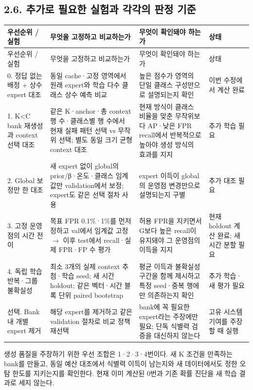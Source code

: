\subsection*{2.6. 추가로 필요한 실험과 각각의 판정 기준}
\begingroup
\footnotesize
\begin{longtable}{>{\raggedright\arraybackslash}p{}>{\raggedright\arraybackslash}p{}>{\raggedright\arraybackslash}p{}>{\raggedright\arraybackslash}p{}}
\toprule
우선순위 /\allowbreak{} 실험 & 무엇을 고정하고 비교하는가 & 무엇이 확인돼야 하는가 & 상태 \\ \midrule
\endfirsthead
우선순위 /\allowbreak{} 실험 & 무엇을 고정하고 비교하는가 & 무엇이 확인돼야 하는가 & 상태 \\ \midrule
\endhead
{}0. 정답 없는 배정 +\allowbreak{} 상수 expert 대조 & 동일 cache·고정 영역에서 원래 expert와 학습 다수 클래스 상수 예측 비교 & 높은 점수가 영역의 단일 클래스 구성만으로 설명되는지 확인 & 이번 수정에서 계산 완료 \\
{}1. K<C bank 재생성과 context 선택 대조 & 같은 K·anchor·총 context 행 수·클래스별 행 수에서 현재 실패 패턴 선택 vs 무작위 선택; 별도 동일 크기 균형 context 대조 & 현재 방식이 클래스 비율을 맞춘 무작위보다 AP·낮은 FPR recall에서 반복적으로 높아야 생성 방식의 효과를 지지 & 추가 학습 필요 \\
{}2. Global 보정만 한 대조 & 새 expert 없이 global의 prior/\allowbreak{}β·온도·클래스 임계값만 validation에서 보정; expert도 같은 선택 절차 사용 & expert 이득이 global의 운영점 변경만으로 설명되는지 구별 & 추가 대조 필요 \\
{}3. 고정 운영점의 시간 전이 & 목표 FPR 0.1\%·1\%를 먼저 정하고 val에서 임계값 고정  \ensuremath{\rightarrow}  이후 test에서 recall·실제 FPR·FP 수 평가 & 허용 FPR을 지키면서 G보다 높은 recall이 유지돼야 그 운영점의 이득을 지지 & 현재 holdout 계산 완료; 새 시간 분할 필요 \\
{}4. 독립 학습 반복·그룹 불확실성 & 최소 3개의 실제 context 추첨·학습 seed; 새 시간 holdout; 같은 벡터·시간 블록 단위 paired bootstrap & 평균 이득과 불확실성 구간을 함께 제시하고 특정 seed·중복 행에만 의존하는지 확인 & 추가 학습·새 평가 필요 \\
{}선택. Bank 내 개별 expert 제거 & 해당 expert를 제거하고 같은 validation 절차로 비교 정책 재선택 & bank에 꼭 필요한 expert라는 주장에만 필요; 단독 식별력 검증을 대신하지 않는다 & 고유 시스템 기여를 주장할 때 실행 \\
\bottomrule
\end{longtable}
\endgroup
생성 품질을 주장하기 위한 우선 조합은 1·2·3·4번이다. 새 K 조건을 만족하는 bank를 만들고, 동일 예산 대조에서 식별력 이득이 남는지와 새 데이터에서도 정한 오탐 한도를 지키는지를 확인한다. 현재 이미 계산된 0번과 기존 확률 진단을 새 학습 결과로 세지 않는다.

